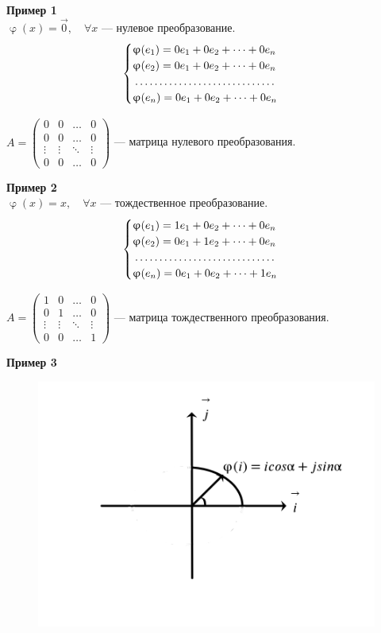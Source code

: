 \documentclass[a4paper, 12pt]{article}
\renewcommand{\varphi}{\upvarphi}
\begin{document}
\textbf{Пример 1}\\
$\varphi(x) = \vec 0, \quad \forall x$ --- нулевое преобразование.
$$\begin{cases}
     \varphi(e_1)=0e_1+0e_2+\dots+0e_n\\  
     \varphi(e_2)=0e_1+0e_2+\dots+0e_n\\ 
     \dotfill\\
     \varphi(e_n)=0e_1+0e_2+\dots+0e_n\\ 
\end{cases}$$
\begin{center}
    $A = \begin{pmatrix}
    0 & 0 & \dots & 0\\
    0 & 0 & \dots & 0\\
    \vdots & \vdots & \ddots & \vdots\\
    0 & 0 & \dots & 0
    \end{pmatrix}$
    --- матрица нулевого преобразования.\\
    \end{center}
\textbf{Пример 2}\\
$\varphi(x) = x, \quad \forall x$ --- тождественное преобразование.
$$\begin{cases}
     \varphi(e_1)=1e_1+0e_2+\dots+0e_n\\  
     \varphi(e_2)=0e_1+1e_2+\dots+0e_n\\ 
     \dotfill\\
     \varphi(e_n)=0e_1+0e_2+\dots+1e_n\\ 
\end{cases}$$
\begin{center}
    $A = \begin{pmatrix}
    1 & 0 & \dots & 0\\
    0 & 1 & \dots & 0\\
    \vdots & \vdots & \ddots & \vdots\\
    0 & 0 & \dots & 1
    \end{pmatrix}$
    --- матрица тождественного преобразования.\\
    \end{center}    
\textbf{Пример 3}
\begin{figure}[h]
    \begin{center}
    \includegraphics[scale=0.8]{2.png}
    \end{center}
    \end{figure}\\
\end{document}
